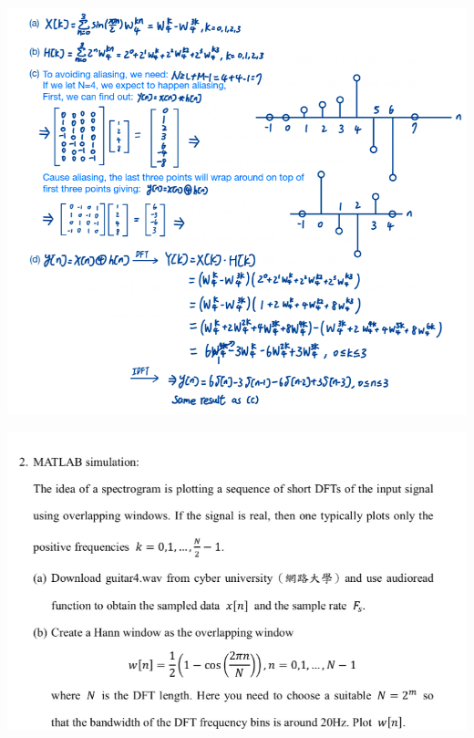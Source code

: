 \documentclass[a4paper]{article}
\begin{document}
	
\begin{center}
	\includegraphics[width=1\linewidth]{screenshot099}
\end{center}

	
	\begin{center}
		\includegraphics[width=1\linewidth]{screenshot100}
	\end{center}
	
\end{document}

